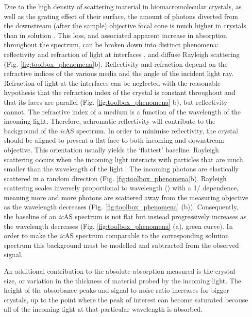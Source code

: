 Due to the high density of scattering material in biomacromolecular crystals, as well as the grating effect of their surface, the amount of photons diverted from the downstream (after the sample) objective focal cone is much higher in crystals than in solution \parencite{dworkowskiChallengesSolutionsAnalysis2015,vonstettenCrystalloOpticalSpectroscopy2015}. This loss, and associated apparent increase in absorption throughout the spectrum, can be broken down into distinct phenomena: reflectivity and refraction of light at interfaces \parencite{coleDeterminationLocalRefractive1995}, and diffuse Rayleigh scattering (Fig. \ref{fig:toolbox_phenomena}b). Reflectivity and refraction depend on the refractive indices of the various media and the angle of the incident light ray. Refraction of light at the interfaces can be neglected with the reasonable hypothesis that the refraction index of the crystal is constant throughout and that its faces are parallel (Fig. \ref{fig:toolbox_phenomena} b), but reflectivity cannot. The refractive index of a medium is a function of the wavelength of the incoming light. Therefore, achromatic reflectivity will contribute to the background of the \textit{ic}AS spectrum. In order to minimise reflectivity, the crystal should be aligned to present a flat face to both incoming and downstream objective. This orientation usually yields the ‘flattest’ baseline. Rayleigh scattering occurs when the incoming light interacts with particles that are much smaller than the wavelength of the light \parencite{lahiriChapterDiffractionScattering2016}. The incoming photons are elastically scattered in a random direction (Fig. \ref{fig:toolbox_phenomena}b). Rayleigh scattering scales inversely proportional to wavelength (\textlambda )  with a 1/ dependence, meaning more and more photons are scattered away from the measuring objective as the wavelength decreases (Fig. \ref{fig:toolbox_phenomena} (b)). Consequently, the baseline of an \textit{ic}AS spectrum is not flat but instead progressively increases as the wavelength decreases (Fig. \ref{fig:toolbox_phenomena} (a), green curve). In order to make the \textit{ic}AS spectrum comparable to the corresponding solution spectrum this background must be modelled and subtracted from the observed signal.

An additional contribution to the absolute absorption measured is the crystal size, or variation in the thickness of material probed by the incoming light. The height of the absorbance peaks and signal to noise ratio increases for bigger crystals, up to the point where the peak of interest can become saturated because all of the incoming light at that particular wavelength is absorbed.


